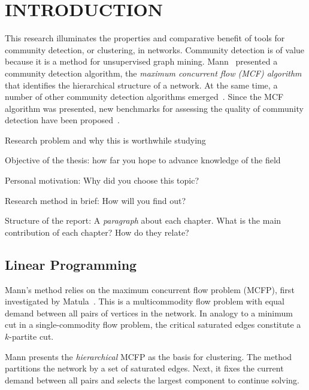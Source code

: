 \chapter{INTRODUCTION} \label{ch:introduction}%




This research illuminates the properties and comparative benefit of tools for community detection, or clustering, in networks. Community detection is of value because it is a method for unsupervised graph mining. 
Mann~\cite{mann2008sparsest} presented a community detection algorithm, the \emph{maximum concurrent flow (MCF) algorithm} that identifies the hierarchical structure of a network. At the same time, a number of other community detection algorithms emerged~\cite{lots of stuff}. Since the MCF algorithm was presented, new benchmarks for assessing the quality of community detection have been proposed~\cite{lancichinetti2008benchmark}. 

Research problem and why this is worthwhile studying

Objective of the thesis: how far you hope to advance knowledge of the field

Personal motivation: Why did you choose this topic?

Research method in brief: How will you find out?

Structure of the report: A \emph{paragraph} about each chapter. What is the main contribution of each chapter? How do they relate?

\section{Linear Programming}\label{sec:Linear Programming}

Mann's method relies on the maximum concurrent flow problem (MCFP), first investigated by Matula~\cite{matula1985concurrent}. This is a multicommodity flow problem with equal demand between all pairs of vertices in the network. In analogy to a minimum cut in a single-commodity flow problem, the critical saturated edges constitute a $k$-partite cut.

Mann presents the \emph{hierarchical} MCFP as the basis for clustering. The method partitions the network by a set of saturated edges. Next, it fixes the current demand between all pairs and selects the largest component to continue solving. 


